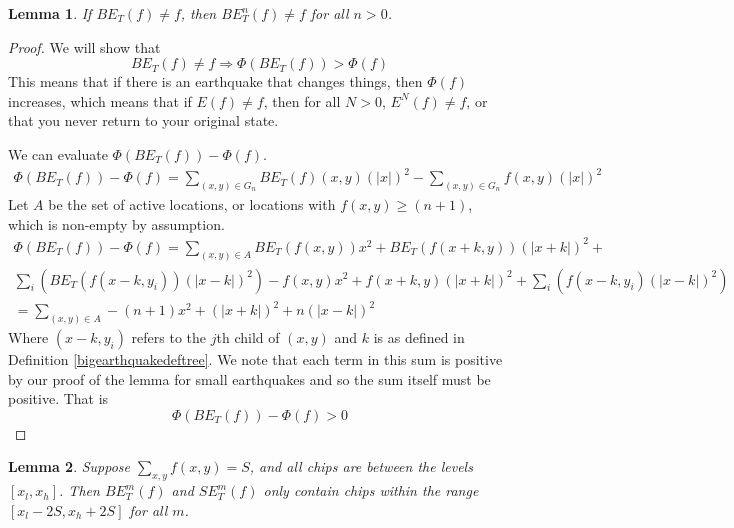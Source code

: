 \documentclass[11pt]{article}
\newtheorem{lemma}{Lemma}
\begin{document}
\begin{lemma}
If $BE_T(f) \neq f$, then $BE_T^n(f) \neq f$ for all $n > 0$.
\end{lemma}

\begin{proof}
We will show that 
\begin{equation}
BE_T(f) \neq f \Rightarrow \Phi(BE_T(f)) > \Phi(f)
\end{equation}
This means that if there is an earthquake that changes things, then $\Phi(f)$ increases, which means that if $E(f) \neq f$, then for all $N > 0$, $E^N(f) \neq f$, or that you never return to your original state.

We can evaluate $\Phi(BE_T(f)) - \Phi(f)$.
\begin{align}
\Phi(BE_T(f))-\Phi(f) = \sum_{(x,y) \in G_n} BE_T(f)(x,y)(|x|)^2 - \sum_{(x,y) \in G_n} f(x,y)(|x|)^2 
\end{align}
Let $A$ be the set of active locations, or locations with $f(x,y) \geq (n+1)$, which is non-empty by assumption. 
\begin{align*}
\Phi(BE_T(f)) - \Phi(f) =  \sum_{(x,y) \in A}  BE_T(f(x,y))x^2 + BE_T(f(x+k,y))(|x+k|)^2 + \\
\sum_{i} \left( BE_T(f(x-k,y_i))(|x-k|)^2 \right) -f(x,y)x^2 +f(x+k,y) (|x+k|)^2 +  \sum_{i} \left ( f(x-k,y_i) (|x-k|)^2 \right)  \\
=\sum_{(x,y) \in A} -(n+1)x^2 + (|x+k|)^2 + n(|x-k|)^2 
\end{align*}
Where $(x-k,y_i)$ refers to the $j$th child of $(x,y)$ and $k$ is as defined in Definition \ref{bigearthquakedeftree}. We note that each term in this sum is positive by our proof of the lemma for small earthquakes and so the sum itself must be positive. That is 
\begin{equation}
\Phi(BE_T(f)) - \Phi(f) > 0
\end{equation}

\end{proof}

\begin{lemma}
\label{finiteextensiontree}
Suppose $\sum_{x,y} f(x,y) = S$, and all chips are between the levels $[x_l, x_h]$. Then $BE_T^m(f)$ and $SE_T^m(f)$ only contain chips within the range $[x_l - 2S, x_h + 2S]$ for all $m$.
\end{lemma}
\end{document}
